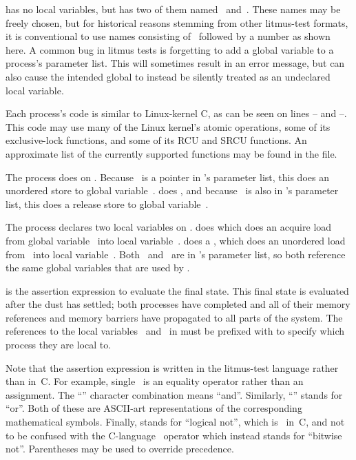 \begin{fcvref}
 has no local variables, but  has two of them
named~ and~.
These names may be freely chosen, but for historical reasons stemming from
other litmus-test formats, it is conventional to use names consisting
of~ followed by a number as shown here.
A common bug in litmus tests is forgetting to add a global variable to
a process's parameter list.
This will sometimes result in an error message, but can also cause the
intended global to instead be silently treated as an undeclared local
variable.

Each process's code is similar to Linux-kernel C, as can be seen on
lines -- and --.
This code may use many of the Linux kernel's atomic operations, some
of its exclusive-lock functions, and some of its RCU and SRCU functions.
An approximate list of the currently supported functions may be found in
the  file.

The  process does  on .
Because ~is a pointer in 's parameter list, this does an
unordered store to global variable~.
 does , and because ~is
also in 's parameter list, this does a release store to global
variable~.

The  process declares two local variables on .
 does  which does an acquire load
from global variable~ into local variable~.
 does a , which does an unordered
load from~ into local variable~.
Both ~and~ are in 's parameter list, so both
reference the same global variables that are used by .

 is the  assertion expression to evaluate
the final state.
This final state is evaluated after the dust has settled; both processes
have completed and all of their memory references and memory barriers
have propagated to all parts of the system.
The references to the local variables~ and~ in 
must be prefixed with  to specify which process they are local to.

Note that the assertion expression is written in the litmus-test
language rather than in~C.
For example, single~\qco{=} is an equality operator rather than an assignment.
The ``\co{/\\}'' character combination means ``and''.
Similarly, ``\co{\\/}'' stands for ``or''.
Both of these are ASCII-art representations of the corresponding
mathematical symbols.
Finally, \qco{\~} stands for ``logical not'', which is~\qco{\!} in~C,
and not to be confused with the C-language \qco{\~}~operator which instead
stands for ``bitwise not''.
Parentheses may be used to override precedence.


\end{fcvref}
